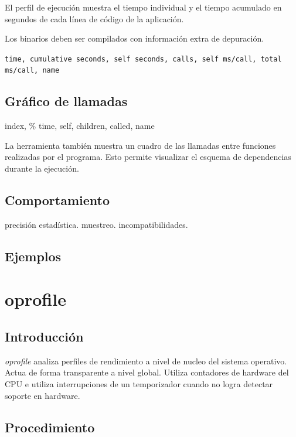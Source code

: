 \documentclass[a4paper]{report}
\begin{document}
El perfil de ejecuci\'on muestra el tiempo individual y el tiempo acumulado en segundos
de cada l\'inea de c\'odigo de la aplicaci\'on.

Los binarios deben ser compilados con informaci\'on extra de depuraci\'on.

{\tt time, cumulative seconds, self seconds, calls, self ms/call,
  total ms/call, name}

\subsection{Gr\'afico de llamadas}

index, \% time, self, children, called, name

La herramienta tambi\'en muestra un cuadro de las llamadas entre funciones realizadas por el programa.
Esto permite visualizar el esquema de dependencias durante la ejecuci\'on.

\subsection{Comportamiento}

precisi\'on estad\'istica. muestreo. incompatibilidades.

\subsection{Ejemplos}

\section{oprofile}

\subsection{Introducci\'on}

{\it oprofile} analiza perfiles de rendimiento a nivel de nucleo del
sistema operativo. Actua de forma transparente a nivel global. Utiliza
contadores de hardware del CPU e utiliza interrupciones de un temporizador
cuando no logra detectar soporte en hardware.


\subsection{Procedimiento}
\end{document}
